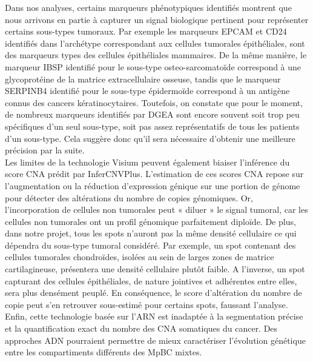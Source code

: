 \documentclass[11pt]{article}
\begin{document}
Dans nos analyses, certains marqueurs phénotypiques identifiés montrent que nous arrivons en partie à capturer un signal biologique pertinent pour représenter certains sous-types tumoraux. Par exemple les marqueurs EPCAM et CD24 identifiés dans l’archétype correspondant aux cellules tumorales épithéliales, sont des marqueurs types des cellules épithéliales mammaires. De la même manière, le marqueur IBSP identifié pour le sous-type osteo-sarcomatoïde correspond à une glycoprotéine de la matrice extracellulaire osseuse, tandis que le marqueur SERPINB4 identifié pour le sous-type épidermoïde correspond à un antigène connus des cancers kératinocytaires. Toutefois, on constate que pour le moment, de nombreux marqueurs identifiés par DGEA sont encore souvent soit trop peu spécifiques d’un seul sous-type, soit pas assez représentatifs de tous les patients d’un sous-type. Cela suggère donc qu’il sera nécessaire d’obtenir une meilleure précision par la suite. \\

Les limites de la technologie Visium peuvent également biaiser l’inférence du score CNA prédit par InferCNVPlus. L’estimation de ces scores CNA repose sur l’augmentation ou la réduction d’expression génique sur une portion de génome pour détecter des altérations du nombre de copies génomiques. Or, l’incorporation de cellules non tumorales peut « diluer » le signal tumoral, car les cellules non tumorales ont un profil génomique parfaitement diploïde. De plus, dans notre projet, tous les spots n’auront pas la même densité cellulaire ce qui dépendra du sous-type tumoral considéré. Par exemple, un spot contenant des cellules tumorales chondroïdes, isolées au sein de larges zones de matrice cartilagineuse, présentera une densité cellulaire plutôt faible. A l’inverse, un spot capturant des cellules épithéliales, de nature jointives et adhérentes entre elles, sera plus densément peuplé. En conséquence, le score d’altération du nombre de copie peut s’en retrouver sous-estimé pour certains spots, faussant l’analyse. Enfin, cette technologie basée sur l’ARN est inadaptée à la segmentation précise et la quantification exact du nombre des CNA somatiques du cancer. Des approches ADN pourraient permettre de mieux caractériser l’évolution génétique entre les compartiments différents des MpBC mixtes.\\
\end{document}
